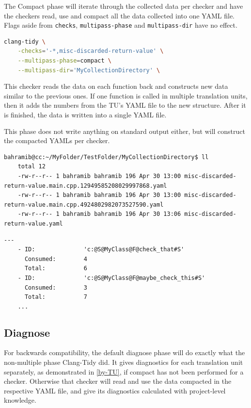 The Compact phase will iterate through the collected data per checker and have the checkers read, use and compact all the data collected
into one YAML file. Flags aside from \texttt{checks}, \texttt{multipass-phase} and \texttt{multipass-dir} have no effect.

\begin{lstlisting}[language={bash}]
	clang-tidy \
	-checks='-*,misc-discarded-return-value' \
	--multipass-phase=compact \
	--multipass-dir='MyCollectionDirectory' \
\end{lstlisting}

This checker reads the data on each function back and constructs new data similar to the previous ones. If one function is called in multiple
translation units, then it adds the numbers from the TU's YAML file to the new structure. After it is finished, the data is
written into a single YAML file.
\par This phase does not write anything on standard output either, but will construct the compacted YAMLs per checker.

\begin{lstlisting}[caption={The new file containing the collected data.},captionpos=b]
	bahramib@cc:~/MyFolder/TestFolder/MyCollectionDirectory$ ll
	total 12
	-rw-r--r-- 1 bahramib bahramib 196 Apr 30 13:00 misc-discarded-return-value.main.cpp.12949585208029997868.yaml
	-rw-r--r-- 1 bahramib bahramib 196 Apr 30 13:00 misc-discarded-return-value.main.cpp.4924802982073527590.yaml
	-rw-r--r-- 1 bahramib bahramib 196 Apr 30 13:06 misc-discarded-return-value.yaml
\end{lstlisting}

\begin{lstlisting}[caption={Contents of the compacted file: the grouped sum of the input.},captionpos=b]
	---
	- ID:              'c:@S@MyClass@F@check_that#S'
	  Consumed:        4
	  Total:           6
	- ID:              'c:@S@MyClass@F@maybe_check_this#S'
	  Consumed:        3
	  Total:           7
	...
\end{lstlisting}

\subsection{Diagnose}

For backwards compatibility, the default diagnose phase will do exactly what the non-multiple
phase Clang-Tidy did. It gives diagnostics for each translation unit separately, as demonstrated in \cref{by-TU},
if compact has not been performed for a checker. Otherwise that checker will read and use the data compacted
in the respective YAML file, and give its diagnostics calculated with project-level knowledge.

